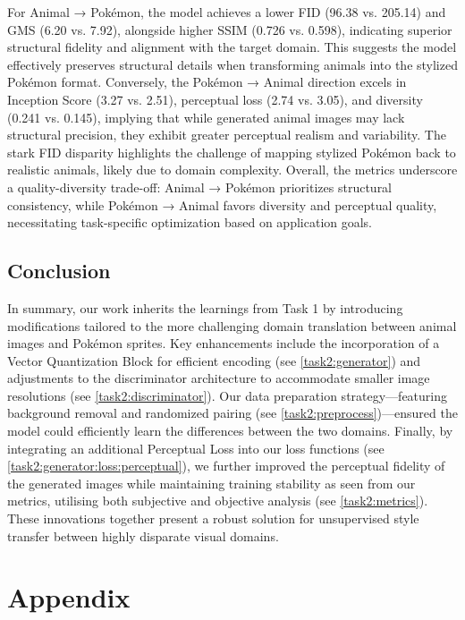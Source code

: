 \documentclass[twoside,english,notitlepage]{report}
\begin{document}
For Animal → Pokémon, the model achieves a lower FID (96.38 vs. 205.14) and GMS (6.20 vs. 7.92), alongside higher SSIM (0.726 vs. 0.598), indicating superior structural fidelity and alignment with the target domain. This suggests the model effectively preserves structural details when transforming animals into the stylized Pokémon format. Conversely, the Pokémon → Animal direction excels in Inception Score (3.27 vs. 2.51), perceptual loss (2.74 vs. 3.05), and diversity (0.241 vs. 0.145), implying that while generated animal images may lack structural precision, they exhibit greater perceptual realism and variability. The stark FID disparity highlights the challenge of mapping stylized Pokémon back to realistic animals, likely due to domain complexity. Overall, the metrics underscore a quality-diversity trade-off: Animal → Pokémon prioritizes structural consistency, while Pokémon → Animal favors diversity and perceptual quality, necessitating task-specific optimization based on application goals.

\section{Conclusion}
In summary, our work inherits the learnings from Task 1 by introducing modifications tailored to the more challenging domain translation between animal images and Pokémon sprites. Key enhancements include the incorporation of a Vector Quantization Block for efficient encoding (see \ref{task2:generator}) and adjustments to the discriminator architecture to accommodate smaller image resolutions (see \ref{task2:discriminator}). Our data preparation strategy—featuring background removal and randomized pairing (see \ref{task2:preprocess})—ensured the model could efficiently learn the differences between the two domains. Finally, by integrating an additional Perceptual Loss into our loss functions (see \ref{task2:generator:loss:perceptual}), we further improved the perceptual fidelity of the generated images while maintaining training stability as seen from our metrics, utilising both subjective and objective analysis (see \ref{task2:metrics}). These innovations together present a robust solution for unsupervised style transfer between highly disparate visual domains.






\chapter{Appendix}
\end{document}
